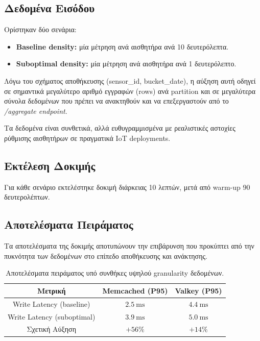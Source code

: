 \subsection{Δεδομένα Εισόδου}

Ορίστηκαν δύο σενάρια:

\begin{itemize}
	\item \textbf{Baseline density:} μία μέτρηση ανά αισθητήρα ανά 10 δευτερόλεπτα.
	\item \textbf{Suboptimal density:} μία μέτρηση ανά αισθητήρα ανά 1 δευτερόλεπτο.
\end{itemize}

Λόγω του σχήματος αποθήκευσης (sensor\_id, bucket\_date), η αύξηση αυτή οδηγεί
σε σημαντικά μεγαλύτερο αριθμό εγγραφών (rows) ανά partition και σε μεγαλύτερα
σύνολα δεδομένων που πρέπει να ανακτηθούν και να επεξεργαστούν από το
\textit{/aggregate endpoint}.

Τα δεδομένα είναι συνθετικά, αλλά ευθυγραμμισμένα με ρεαλιστικές αστοχίες
ρύθμισης αισθητήρων σε πραγματικά IoT deployments.

\subsection{Εκτέλεση Δοκιμής}

Για κάθε σενάριο εκτελέστηκε δοκιμή διάρκειας 10 λεπτών, μετά από warm-up 90
δευτερολέπτων.

\subsection{Αποτελέσματα Πειράματος}

Τα αποτελέσματα της δοκιμής αποτυπώνουν την επιβάρυνση που προκύπτει από την
πυκνότητα των δεδομένων στο επίπεδο αποθήκευσης και ανάκτησης.

\begin{table}[h!]
	\centering
	\begin{tabular}{|c|c|c|}
		\hline
		\textbf{Μετρική}           & \textbf{Memcached (P95)} & \textbf{Valkey (P95)} \\
		\hline
		Write Latency (baseline)   & $2.5\ \text{ms}$         & $4.4\ \text{ms}$      \\
		\hline
		Write Latency (suboptimal) & $3.9\ \text{ms}$         & $5.0\ \text{ms}$      \\
		\hline
		Σχετική Αύξηση             & $+56\%$                  & $+14\%$               \\
		\hline
	\end{tabular}
	\caption{Αποτελέσματα πειράματος υπό συνθήκες υψηλού granularity δεδομένων.}
	\label{tab:exp2_results}
\end{table}

